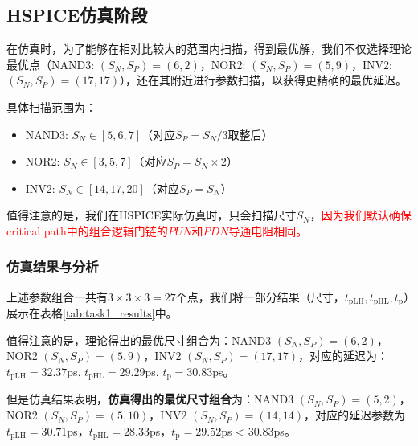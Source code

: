 \documentclass[UTF8,12pt,a4paper]{ctexart}
\begin{document}
\subsection{HSPICE仿真阶段}

在仿真时，为了能够在相对比较大的范围内扫描，得到最优解，我们不仅选择理论最优点（NAND3: $(S_N, S_P) = (6, 2)$，NOR2: $(S_N, S_P) = (5, 9)$，INV2: $(S_N, S_P) = (17, 17)$），还在其附近进行参数扫描，以获得更精确的最优延迟。

具体扫描范围为：
\begin{itemize}
    \item NAND3: $S_N \in [5, 6, 7]$（对应$S_P = S_N/3$取整后）
    \item NOR2: $S_N \in [3, 5, 7]$（对应$S_P = S_N \times 2$）
    \item INV2: $S_N \in [14, 17, 20]$（对应$S_P = S_N$）
\end{itemize}

值得注意的是，我们在HSPICE实际仿真时，只会扫描尺寸$S_N$，\textcolor{red}{因为我们默认确保critical path中的组合逻辑门链的$PUN$和$PDN$导通电阻相同。}

\subsubsection{仿真结果与分析}
上述参数组合一共有$3\times3\times3=27$个点，我们将一部分结果（尺寸，$t_{\text{pLH}}, t_{\text{pHL}}, t_{\text{p}}$）展示在表格\ref{tab:task1_results}中。

值得注意的是，理论得出的最优尺寸组合为：NAND3 $(S_N, S_P) = (6, 2)$，NOR2 $(S_N, S_P) = (5, 9)$，INV2 $(S_N, S_P) = (17, 17)$，对应的延迟为：$t_{\text{pLH}}=32.37$ps, $t_{\text{pHL}} = 29.29$ps, $t_{\text{p}} = 30.83$ps。

但是仿真结果表明，\textbf{仿真得出的最优尺寸组合}为：NAND3 $(S_N, S_P) = (5, 2)$，NOR2 $(S_N, S_P) = (5, 10)$，INV2 $(S_N, S_P) = (14, 14)$，对应的延迟参数为$t_{\text{pLH}} = 30.71$ps，$t_{\text{pHL}} = 28.33$ps，$t_{\text{p}} = 29.52$ps < $30.83$ps。
\end{document}
